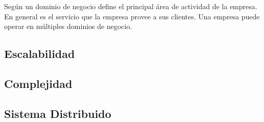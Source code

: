 Según \cite{khononov2021learning} un dominio de negocio define el principal área de actividad de
la empresa. En general es el servicio que la empresa provee a sus clientes.
Una empresa puede operar en múltiples dominios de negocio.


\subsection{Escalabilidad}


\subsection{Complejidad}


\subsection{Sistema Distribuido}

